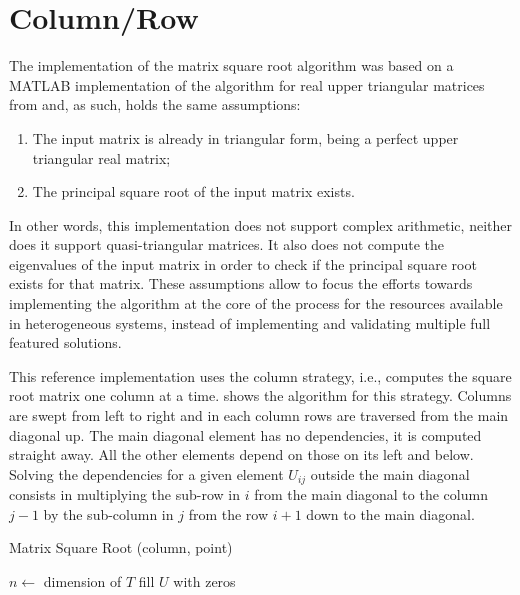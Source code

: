 \documentclass[../thesis]{subfiles}
\begin{document}
	\section{Column/Row}
	\label{sec:multicore:column}
	The implementation of the matrix square root algorithm was based on a MATLAB implementation of the algorithm for real upper triangular matrices from \cite{Deadman:Higham:Ralha:2013} and, as such, holds the same assumptions:
		\begin{enumerate}
			\item The input matrix is already in triangular form, being a perfect upper triangular real matrix;
			\item The principal square root of the input matrix exists.
		\end{enumerate}
	In other words, this implementation does not support complex arithmetic, neither does it support quasi-triangular matrices. It also does not compute the eigenvalues of the input matrix in order to check if the principal square root exists for that matrix. These assumptions allow to focus the efforts towards implementing the algorithm at the core of the process for the resources available in heterogeneous systems, instead of implementing and validating multiple full featured solutions.

	This reference implementation uses the column strategy, i.e., computes the square root matrix one column at a time.  shows the algorithm for this strategy. Columns are swept from left to right and in each column rows are traversed from the main diagonal up. The main diagonal element has no dependencies, it is computed straight away. All the other elements depend on those on its left and below. Solving the dependencies for a given element $U_{ij}$ outside the main diagonal consists in multiplying the sub-row in $i$ from the main diagonal to the column $j-1$ by the sub-column in $j$ from the row $i+1$ down to the main diagonal.

	\begin{algorithm}[htp]
		\caption{Matrix Square Root (column, point)}
		\label{alg:sqrtm:column:point}
		\DontPrintSemicolon


		$n \leftarrow$ dimension of $T$\;
		fill $U$ with zeros\;

	\end{algorithm}
\end{document}
